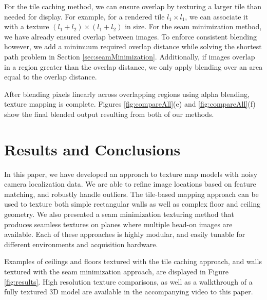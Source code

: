 \documentclass[10pt,twocolumn,letterpaper]{article}
\begin{document}
For the tile caching method, we can ensure overlap by texturing a
larger tile than needed for display. For example, for a rendered tile
$l_1 \times l_1$, we can associate it with a texture $(l_1 + l_2)
\times (l_1 + l_2)$ in size. For the seam minimization method, we have
already ensured overlap between images. To enforce consistent blending
however, we add a minimuum required overlap distance while solving the
shortest path problem in Section
\ref{sec:seamMinimization}. Additionally, if images overlap in a
region greater than the overlap distance, we only apply blending over
an area equal to the overlap distance.

After blending pixels linearly across overlapping regions using alpha
blending, texture mapping is complete. Figures \ref{fig:compareAll}(e)
and \ref{fig:compareAll}(f) show the final blended output resulting
from both of our methods.



\section{Results and Conclusions}
\label{sec:resultsAndConclusions}
In this paper, we have developed an approach to texture map models
with noisy camera localization data. We are able to refine image
locations based on feature matching, and robustly handle outliers. The tile-based mapping approach can be used to texture both simple rectangular walls as
well as complex floor and ceiling geometry. We also presented a seam minimization texturing method that produces seamless textures on planes where
multiple head-on images are available. Each of these approaches is
highly modular, and easily tunable for different environments and
acquisition hardware.

Examples of ceilings and floors textured with the tile caching approach, and walls
textured with the seam minimization approach, are displayed in Figure
\ref{fig:results}. High resolution texture comparisons, as well as a
walkthrough of a fully textured 3D model are available in the
accompanying video to this paper.
\end{document}
